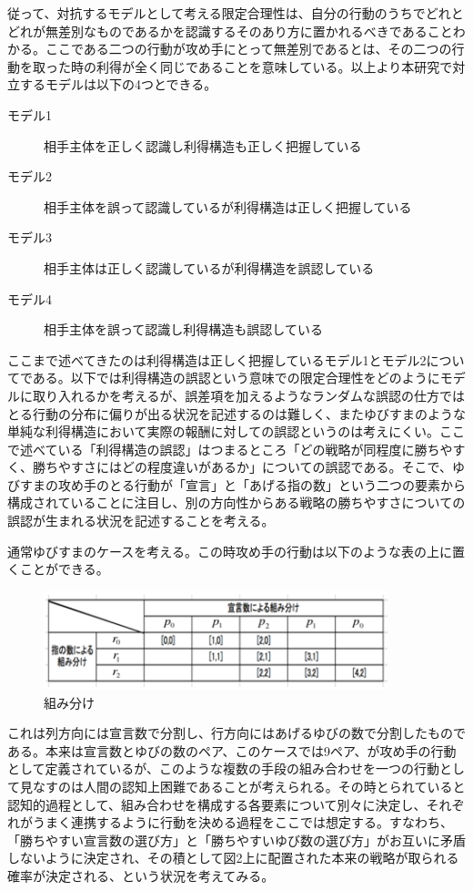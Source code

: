 \documentclass{jsarticle}
\begin{document}
従って、対抗するモデルとして考える限定合理性は、自分の行動のうちでどれとどれが無差別なものであるかを認識するそのあり方に置かれるべきであることわかる。ここである二つの行動が攻め手にとって無差別であるとは、その二つの行動を取った時の利得が全く同じであることを意味している。以上より本研究で対立するモデルは以下の4つとできる。

\begin{description}
	\item[モデル1] 相手主体を正しく認識し利得構造も正しく把握している
	\item[モデル2] 相手主体を誤って認識しているが利得構造は正しく把握している
	\item[モデル3] 相手主体は正しく認識しているが利得構造を誤認している
	\item[モデル4] 相手主体を誤って認識し利得構造も誤認している
\end{description}

ここまで述べてきたのは利得構造は正しく把握しているモデル1とモデル2についてである。以下では利得構造の誤認という意味での限定合理性をどのようにモデルに取り入れるかを考えるが、誤差項を加えるようなランダムな誤認の仕方ではとる行動の分布に偏りが出る状況を記述するのは難しく、またゆびすまのような単純な利得構造において実際の報酬に対しての誤認というのは考えにくい。ここで述べている「利得構造の誤認」はつまるところ「どの戦略が同程度に勝ちやすく、勝ちやすさにはどの程度違いがあるか」についての誤認である。そこで、ゆびすまの攻め手のとる行動が「宣言」と「あげる指の数」という二つの要素から構成されていることに注目し、別の方向性からある戦略の勝ちやすさについての誤認が生まれる状況を記述することを考える。

通常ゆびすまのケースを考える。この時攻め手の行動は以下のような表の上に置くことができる。
\begin{figure}[h]
    \centering
    \includegraphics[width=10cm]{class.png}
    \caption{組み分け}
\end{figure}
これは列方向には宣言数で分割し、行方向にはあげるゆびの数で分割したものである。本来は宣言数とゆびの数のペア、このケースでは9ペア、が攻め手の行動として定義されているが、このような複数の手段の組み合わせを一つの行動として見なすのは人間の認知上困難であることが考えられる。その時とられていると認知的過程として、組み合わせを構成する各要素について別々に決定し、それぞれがうまく連携するように行動を決める過程をここでは想定する。すなわち、「勝ちやすい宣言数の選び方」と「勝ちやすいゆび数の選び方」がお互いに矛盾しないように決定され、その積として図2上に配置された本来の戦略が取られる確率が決定される、という状況を考えてみる。
\end{document}
